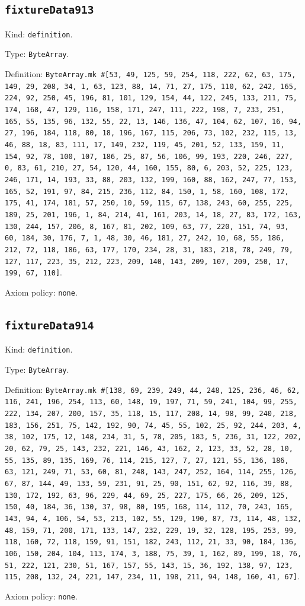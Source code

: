 \documentclass[11pt]{article}
\begin{document}
\subsection*{\texttt{fixtureData913}}
\noindent Kind: \texttt{definition}.\par
\noindent Type: \texttt{ByteArray}.\par
\noindent Definition: \texttt{ByteArray.mk \#[53, 49, 125, 59, 254, 118, 222, 62, 63, 175, 149, 29, 208, 34, 1, 63, 123, 88, 14, 71, 27, 175, 110, 62, 242, 165, 224, 92, 250, 45, 196, 81, 101, 129, 154, 44, 122, 245, 133, 211, 75, 174, 168, 47, 129, 116, 158, 171, 247, 111, 222, 198, 7, 233, 251, 165, 55, 135, 96, 132, 55, 22, 13, 146, 136, 47, 104, 62, 107, 16, 94, 27, 196, 184, 118, 80, 18, 196, 167, 115, 206, 73, 102, 232, 115, 13, 46, 88, 18, 83, 111, 17, 149, 232, 119, 45, 201, 52, 133, 159, 11, 154, 92, 78, 100, 107, 186, 25, 87, 56, 106, 99, 193, 220, 246, 227, 0, 83, 61, 210, 27, 54, 120, 44, 160, 155, 80, 6, 203, 52, 225, 123, 246, 171, 14, 193, 33, 88, 203, 132, 199, 160, 88, 162, 247, 77, 153, 165, 52, 191, 97, 84, 215, 236, 112, 84, 150, 1, 58, 160, 108, 172, 175, 41, 174, 181, 57, 250, 10, 59, 115, 67, 138, 243, 60, 255, 225, 189, 25, 201, 196, 1, 84, 214, 41, 161, 203, 14, 18, 27, 83, 172, 163, 130, 244, 157, 206, 8, 167, 81, 202, 109, 63, 77, 220, 151, 74, 93, 60, 184, 30, 176, 7, 1, 48, 30, 46, 181, 27, 242, 10, 68, 55, 186, 212, 72, 118, 186, 63, 177, 170, 234, 28, 31, 183, 218, 78, 249, 79, 127, 117, 223, 35, 212, 223, 209, 140, 143, 209, 107, 209, 250, 17, 199, 67, 110]}.\par
\noindent Axiom policy: \texttt{none}.\par
\subsection*{\texttt{fixtureData914}}
\noindent Kind: \texttt{definition}.\par
\noindent Type: \texttt{ByteArray}.\par
\noindent Definition: \texttt{ByteArray.mk \#[138, 69, 239, 249, 44, 248, 125, 236, 46, 62, 116, 241, 196, 254, 113, 60, 148, 19, 197, 71, 59, 241, 104, 99, 255, 222, 134, 207, 200, 157, 35, 118, 15, 117, 208, 14, 98, 99, 240, 218, 183, 156, 251, 75, 142, 192, 90, 74, 45, 55, 102, 25, 92, 244, 203, 4, 38, 102, 175, 12, 148, 234, 31, 5, 78, 205, 183, 5, 236, 31, 122, 202, 20, 62, 79, 25, 143, 232, 221, 146, 43, 162, 2, 123, 33, 52, 28, 10, 55, 135, 89, 135, 169, 76, 114, 215, 127, 7, 27, 121, 55, 136, 186, 63, 121, 249, 71, 53, 60, 81, 248, 143, 247, 252, 164, 114, 255, 126, 67, 87, 144, 49, 133, 59, 231, 91, 25, 90, 151, 62, 92, 116, 39, 88, 130, 172, 192, 63, 96, 229, 44, 69, 25, 227, 175, 66, 26, 209, 125, 150, 40, 184, 36, 130, 37, 98, 80, 195, 168, 114, 112, 70, 243, 165, 143, 94, 4, 106, 54, 53, 213, 102, 55, 129, 190, 87, 73, 114, 48, 132, 48, 159, 71, 200, 171, 133, 147, 232, 229, 19, 32, 128, 195, 253, 99, 118, 160, 72, 118, 159, 91, 151, 182, 243, 112, 21, 33, 90, 184, 136, 106, 150, 204, 104, 113, 174, 3, 188, 75, 39, 1, 162, 89, 199, 18, 76, 51, 222, 121, 230, 51, 167, 157, 55, 143, 15, 36, 192, 138, 97, 123, 115, 208, 132, 24, 221, 147, 234, 11, 198, 211, 94, 148, 160, 41, 67]}.\par
\noindent Axiom policy: \texttt{none}.\par
\end{document}
